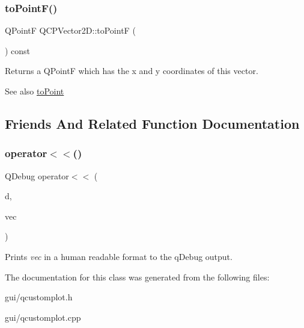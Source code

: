 \subsubsection{\texorpdfstring{to\+Point\+F()}{toPointF()}}
{\footnotesize\ttfamily Q\+PointF Q\+C\+P\+Vector2\+D\+::to\+PointF (\begin{DoxyParamCaption}{ }\end{DoxyParamCaption}) const\hspace{0.3cm}{\ttfamily [inline]}}

Returns a Q\+PointF which has the x and y coordinates of this vector.

\begin{DoxySeeAlso}{See also}
\hyperlink{classQCPVector2D_add3edf75de9b7bf1abc693b973b2e906}{to\+Point} 
\end{DoxySeeAlso}


\subsection{Friends And Related Function Documentation}
\mbox{\label{classQCPVector2D_a6c757af9671d925af4a36c2f58fb7234}} 
\subsubsection{\texorpdfstring{operator$<$$<$()}{operator<<()}}
{\footnotesize\ttfamily Q\+Debug operator$<$$<$ (\begin{DoxyParamCaption}\item[{Q\+Debug}]{d,  }\item[{const \hyperlink{classQCPVector2D}{Q\+C\+P\+Vector2D} \&}]{vec }\end{DoxyParamCaption})\hspace{0.3cm}{\ttfamily [related]}}

Prints {\itshape vec} in a human readable format to the q\+Debug output. 

The documentation for this class was generated from the following files\+:\begin{DoxyCompactItemize}
\item 
gui/qcustomplot.\+h\item 
gui/qcustomplot.\+cpp\end{DoxyCompactItemize}
